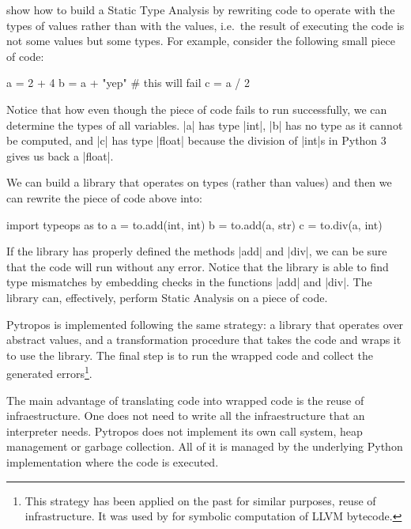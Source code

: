 \textcite{ortin_towards_2015} show how to build a Static Type Analysis
by rewriting code to operate with the types of values rather than with
the values, i.e.~the result of executing the code is not some values but
some types. For example, consider the following small piece of code:

\begin{pythoncode}
a = 2 + 4
b = a + "yep"  # this will fail
c = a / 2
\end{pythoncode}

Notice that how even though the piece of code fails to run successfully,
we can determine the types of all variables. \pycode|a| has type
\pycode|int|, \pycode|b| has no type as it cannot be
computed, and \pycode|c| has type \pycode|float| because the
division of \pycode|int|s in Python 3 gives us back a \pycode|float|.

We can build a library that operates on types (rather than values) and
then we can rewrite the piece of code above into:

\begin{pythoncode}
import typeops as to
a = to.add(int, int)
b = to.add(a, str)
c = to.div(a, int)
\end{pythoncode}

If the library has properly defined the methods \pycode|add| and
\pycode|div|, we can be sure that the code will run without any error.
Notice that the library is able to find type mismatches by embedding
checks in the functions \pycode|add| and \pycode|div|. The library can,
effectively, perform Static Analysis on a piece of code.

Pytropos is implemented following the same strategy: a library that
operates over abstract values, and a transformation procedure that takes
the code and wraps it to use the library. The final step is to run the
wrapped code and collect the generated errors\footnote{This strategy has
  been applied on the past for similar purposes, reuse of
  infrastructure. It was used by \textcite{lauko_symbolic_2018} for
  symbolic computation of LLVM bytecode. {}}.

The main advantage of translating code into wrapped code is the reuse of
infraestructure. One does not need to write all the infraestructure that
an interpreter needs. Pytropos does not implement its own call system,
heap management or garbage collection. All of it is managed by the
underlying Python implementation where the code is executed.

